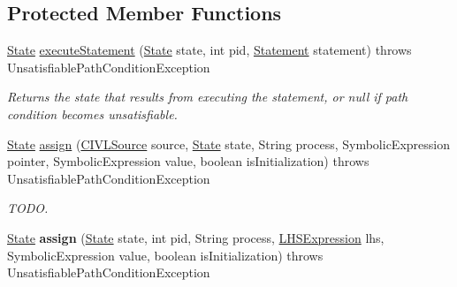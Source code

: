 \subsection*{Protected Member Functions}
\begin{DoxyCompactItemize}
\item 
\hyperlink{interfaceedu_1_1udel_1_1cis_1_1vsl_1_1civl_1_1state_1_1IF_1_1State}{State} \hyperlink{classedu_1_1udel_1_1cis_1_1vsl_1_1civl_1_1semantics_1_1common_1_1CommonExecutor_a49b16cd153904b7dd4a8b8ed8b676607}{execute\+Statement} (\hyperlink{interfaceedu_1_1udel_1_1cis_1_1vsl_1_1civl_1_1state_1_1IF_1_1State}{State} state, int pid, \hyperlink{interfaceedu_1_1udel_1_1cis_1_1vsl_1_1civl_1_1model_1_1IF_1_1statement_1_1Statement}{Statement} statement)  throws Unsatisfiable\+Path\+Condition\+Exception 
\begin{DoxyCompactList}\small\item\em Returns the state that results from executing the statement, or null if path condition becomes unsatisfiable. \end{DoxyCompactList}\item 
\hyperlink{interfaceedu_1_1udel_1_1cis_1_1vsl_1_1civl_1_1state_1_1IF_1_1State}{State} \hyperlink{classedu_1_1udel_1_1cis_1_1vsl_1_1civl_1_1semantics_1_1common_1_1CommonExecutor_a19d890ceb3008d1ea5a8ce645d11fbf6}{assign} (\hyperlink{interfaceedu_1_1udel_1_1cis_1_1vsl_1_1civl_1_1model_1_1IF_1_1CIVLSource}{C\+I\+V\+L\+Source} source, \hyperlink{interfaceedu_1_1udel_1_1cis_1_1vsl_1_1civl_1_1state_1_1IF_1_1State}{State} state, String process, Symbolic\+Expression pointer, Symbolic\+Expression value, boolean is\+Initialization)  throws Unsatisfiable\+Path\+Condition\+Exception 
\begin{DoxyCompactList}\small\item\em T\+O\+D\+O. \end{DoxyCompactList}\item 
\hypertarget{classedu_1_1udel_1_1cis_1_1vsl_1_1civl_1_1semantics_1_1common_1_1CommonExecutor_a653be487ed1f612770f550b127f605b3}{}\hyperlink{interfaceedu_1_1udel_1_1cis_1_1vsl_1_1civl_1_1state_1_1IF_1_1State}{State} {\bfseries assign} (\hyperlink{interfaceedu_1_1udel_1_1cis_1_1vsl_1_1civl_1_1state_1_1IF_1_1State}{State} state, int pid, String process, \hyperlink{interfaceedu_1_1udel_1_1cis_1_1vsl_1_1civl_1_1model_1_1IF_1_1expression_1_1LHSExpression}{L\+H\+S\+Expression} lhs, Symbolic\+Expression value, boolean is\+Initialization)  throws Unsatisfiable\+Path\+Condition\+Exception \label{classedu_1_1udel_1_1cis_1_1vsl_1_1civl_1_1semantics_1_1common_1_1CommonExecutor_a653be487ed1f612770f550b127f605b3}

\end{DoxyCompactItemize}

